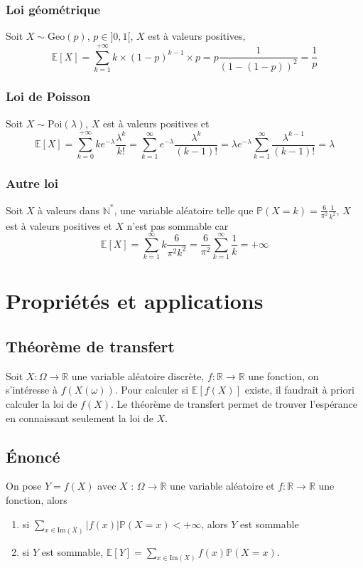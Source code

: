 \documentclass[a4paper,10pt]{book} %
\newcommand{\R}{\mathbb{R}}
\newcommand{\N}{\mathbb{N}}
\newcommand{\E}{\mathbb{E}} %
\renewcommand{\P}{\mathbb{P}} %
\newcommand\abs[1]{\left|#1\right|}
\newcommand{\Ima}{\mathrm{Im}} %
\newcommand{\Geo}{\mathrm{Geo}} %
\newcommand{\Poi}{\mathrm{Poi}} %
\begin{document}
\subsubsection{Loi géométrique}
Soit $X\sim \Geo(p)$, $p\in ]0,1[$, $X$ est à valeurs positives, $$\E[X] = \sum_{k=1}^{+\infty} k\times (1-p)^{k-1}\times p = p\frac{1}{(1-(1-p))^2}=\frac{1}{p}$$

\subsubsection{Loi de Poisson}
Soit $X\sim \Poi(\lambda)$, $X$ est à valeurs positives et $$\E[X]=\sum_{k=0}^{+\infty}ke^{-\lambda}\frac{\lambda^k}{k!} = \sum_{k=1}^\infty e^{-\lambda}\frac{\lambda^k}{(k-1)!} = \lambda e^{-\lambda}\sum_{k=1}^\infty \frac{\lambda^{k-1}}{(k-1)!} =\lambda$$

\subsubsection{Autre loi}
Soit $X$ à valeurs dans $\N^*$, une variable aléatoire telle que $\displaystyle \P(X=k) =\frac{6}{\pi^2}\frac{1}{k^2}$, $X$ est à valeurs positives et $X$ n'est pas sommable car $$\E[X]=\sum_{k=1}^\infty k\frac{6}{\pi^2 k^2}=\frac{6}{\pi^2}\sum_{k=1}^\infty \frac{1}{k}=+\infty$$

\section{Propriétés et applications}
\subsection{Théorème de transfert}
Soit $X : \Omega \rightarrow \R$ une variable aléatoire discrète, $f: \R\rightarrow \R$ une fonction, on s'intéresse à $f(X(\omega))$. Pour calculer si $\E[f(X)]$ existe, il faudrait à priori calculer la loi de $f(X)$. Le théorème de transfert permet de trouver l'espérance en connaissant seulement la loi de $X$.

\subsection{Énoncé}
On pose $Y = f(X)$ avec $X$ : $\Omega\rightarrow\R$ une variable aléatoire et $f:\R\rightarrow \R$ une fonction, alors 
\begin{enumerate}
\item si $\displaystyle \sum_{x\in \Ima(X)}\abs{f(x)}\P(X=x)<+\infty$, alors $Y$ est sommable
\item si $Y$ est sommable, $\displaystyle \E[Y]=\sum_{x\in \Ima(X)}f(x)\P(X=x)$.
\end{enumerate}
\end{document}
